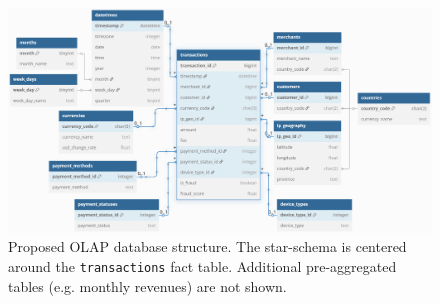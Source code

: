 \documentclass[11pt,a4paper,computermodern]{article}
\newcommand{\code}{\texttt}
\begin{document}
\begin{figure}[!htb]
	\centering
	\includegraphics[scale=0.58]{./figures/OLAP}
	\caption{Proposed OLAP database structure. The star-schema is centered around the \code{transactions} fact table. Additional pre-aggregated tables (e.g. monthly revenues) are not shown.}
	\label{fig:OLAP}
\end{figure}
\end{document}
